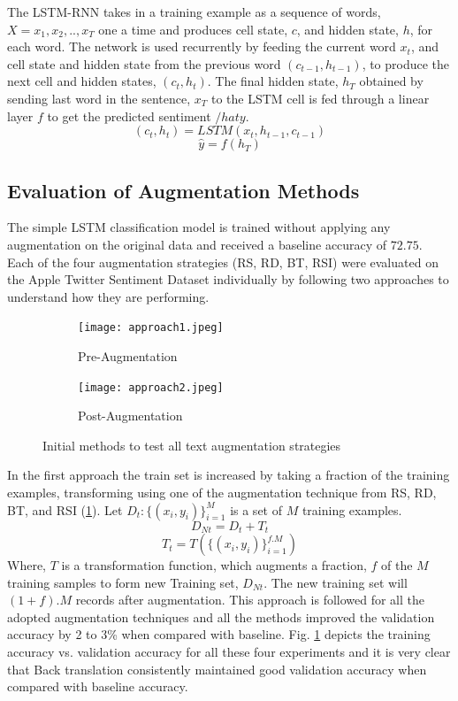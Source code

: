\documentclass{article}
\begin{document}
The LSTM-RNN takes in a training example as a sequence of words, $X = {x_1, x_2, .., x_T}$ one a time and produces cell state, $c$, and hidden state, $h$, for each word. The network is used recurrently by feeding the current word $x_t$, and cell state and hidden state from the previous word $(c_{t-1}, h_{t-1})$, to produce the next cell and hidden states, $(c_t, h_t)$. The final hidden state, $h_T$ obtained by sending last word in the sentence, $x_T$ to the LSTM cell is fed through a linear layer $f$ to get the predicted sentiment $/hat{y}$.
\begin{equation}
(c_t, h_t) = LSTM (x_t, h_{t-1}, c_{t-1}) 
\end{equation}
\begin{equation}
\hat{y} = f(h_T)
\end{equation}

\subsection{Evaluation of Augmentation Methods}
The simple LSTM classification model is trained without applying any augmentation on the original data and received a baseline accuracy of $72.75$. Each of the four augmentation strategies (RS, RD, BT, RSI) were evaluated on the Apple Twitter Sentiment Dataset individually by following two approaches to understand how they are performing. 

\begin{figure}
  \begin{subfigure}{6cm}
    \centering\texttt{[image: approach1.jpeg]}
    \caption{Pre-Augmentation}
  \end{subfigure}
  \begin{subfigure}{6cm}
    \centering\texttt{[image: approach2.jpeg]}
    \caption{Post-Augmentation}
  \end{subfigure}
  \caption{Initial methods to test all text augmentation strategies}
  \label{fig:initialmethods}
\end{figure}


In the first approach the train set is increased by taking a fraction of the training examples, transforming using one of the augmentation technique from RS, RD, BT, and RSI (\ref{fig:initialmethods}). Let $D_t : \{(x_i, y_i)\}_{i=1}^M$ is a set of $M$ training examples.
\begin{equation}
D_{Nt} = D_t + T_t
\end{equation}
\begin{equation}
T_t = T(\{(x_i, y_i)\}_{i=1}^{f.M})
\end{equation}
Where, $T$ is a transformation function, which augments a fraction, $f$ of the $M$ training samples to form new Training set, $D_{Nt}$. The new training set will $(1+f).M$ records after augmentation. This approach is followed for all the adopted augmentation techniques and all the methods improved the validation accuracy by 2 to 3\% when compared with baseline. Fig. \ref{fig:initialmethods} depicts the training accuracy vs. validation accuracy for all these four experiments and it is very clear that Back translation consistently maintained good validation accuracy when compared with baseline accuracy.
\end{document}

